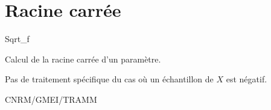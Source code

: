 %
\section{Racine carr\'ee}

 {\sf Sqrt\_f}

Calcul de la racine carr\'ee d'un param\`etre. 

\bigskip






Pas de traitement sp\'ecifique du cas o\`u un \'echantillon de $X$ 
est n\'egatif.

CNRM/GMEI/TRAMM

